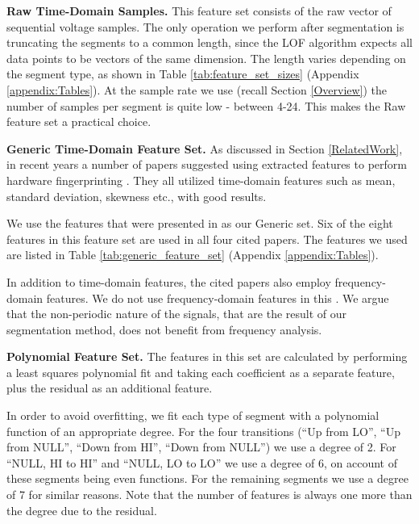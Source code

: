 \documentclass[english]{llncs}
\begin{document}
{\bf Raw Time-Domain Samples.}
  This feature set consists of the raw vector of sequential voltage samples. The only %
  operation we perform after segmentation is truncating the segments to a common length, since the LOF algorithm expects all data points to be vectors of the same dimension. The length varies depending on the segment type, as shown in Table \ref{tab:feature_set_sizes} (Appendix \ref{appendix:Tables}). At the sample rate we use (recall Section \ref{Overview}) the number of samples per segment is quite low - between 4-24. %
  This makes the Raw feature set a practical choice.
  
{\bf Generic Time-Domain Feature Set.}
  As discussed in Section \ref{RelatedWork}, in recent years a number of papers suggested using extracted features to perform hardware fingerprinting \cite{dey2014accelprint, choi2018identifying, choi2018voltageids, kneib2018scission}. They all utilized time-domain features such as mean, standard deviation, skewness etc., with good results.
  
  
  We use the features that were presented in \cite{kneib2018scission} as our Generic set. Six of the eight features in this feature set are used in all four cited papers. The features we used are listed in Table \ref{tab:generic_feature_set} (Appendix \ref{appendix:Tables}).
  
  In addition to time-domain features, the cited papers also employ frequency-domain features. We do not use frequency-domain features in this \iftoggle{paper} {paper} {work}. We argue that the non-periodic nature of the signals, that are the result of our segmentation method, does not benefit from frequency analysis.

{\bf Polynomial Feature Set.}
  The features in this set are calculated by performing a least squares polynomial fit and taking each coefficient as a separate feature, plus the residual as an additional feature.
  
  In order to avoid overfitting, we fit each type of segment with a polynomial function of an appropriate degree. For the four transitions (``Up from LO'', ``Up from NULL'', ``Down from HI'', ``Down from NULL'') we use a degree of 2. For ``NULL, HI to HI'' and ``NULL, LO to LO'' we use a degree of 6, on account of these segments being even functions. For the remaining segments we use a degree of 7 for similar reasons. Note that the number of features is always one more than the degree due to the residual.
  
\end{document}
